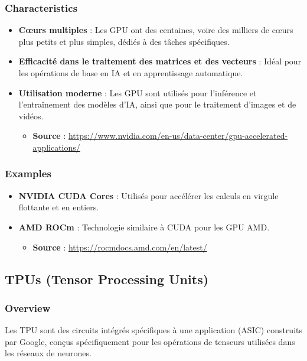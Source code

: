 \documentclass[10pt,a4paper]{article}
\begin{document}
\subsubsection*{Characteristics}
\begin{itemize}
    \item \textbf{Cœurs multiples} : Les GPU ont des centaines, voire des milliers de cœurs plus petits et plus simples, dédiés à des tâches spécifiques.
    \item \textbf{Efficacité dans le traitement des matrices et des vecteurs} : Idéal pour les opérations de base en IA et en apprentissage automatique.
    \item \textbf{Utilisation moderne} : Les GPU sont utilisés pour l'inférence et l'entraînement des modèles d'IA, ainsi que pour le traitement d'images et de vidéos.
    \begin{itemize}
        \item \textbf{Source} : \url{https://www.nvidia.com/en-us/data-center/gpu-accelerated-applications/}
    \end{itemize}
\end{itemize}

\subsubsection*{Examples}
\begin{itemize}
    \item \textbf{NVIDIA CUDA Cores} : Utilisés pour accélérer les calculs en virgule flottante et en entiers.
    \item \textbf{AMD ROCm} : Technologie similaire à CUDA pour les GPU AMD.
    \begin{itemize}
        \item \textbf{Source} : \url{https://rocmdocs.amd.com/en/latest/}
    \end{itemize}
\end{itemize}

\subsection*{TPUs (Tensor Processing Units)}

\subsubsection*{Overview}
Les TPU sont des circuits intégrés spécifiques à une application (ASIC) construits par Google, conçus spécifiquement pour les opérations de tenseurs utilisées dans les réseaux de neurones.
\end{document}

